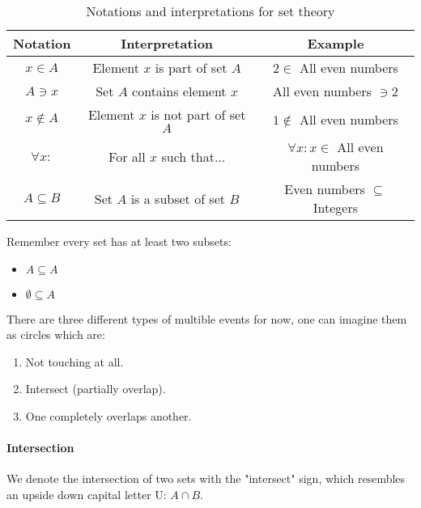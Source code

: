 \documentclass{article}
\begin{document}
\begin{table}[htb]
    \centering
    \begin{tabular}{c|c|c}
        \toprule
        \textbf{Notation} & \textbf{Interpretation} & \textbf{Example} \\
        \midrule
        $x \in A$ & Element $x$ is part of set $A$ & $2 \in$ All even numbers \\
        $A \ni x$ & Set $A$ contains element $x$ & All even numbers $\ni 2$ \\
        $x \notin A$ & Element $x$ is not part of set $A$ & $1 \notin$ All even numbers \\
        $\forall x:$ & For all $x$ such that... & $\forall x: x \in$ All even numbers \\
        $A \subseteq B$ & Set $A$ is a subset of set $B$ & Even numbers $\subseteq$ Integers \\
        \bottomrule
    \end{tabular}
    \caption{Notations and interpretations for set theory}
\end{table}

Remember every set has at least two subsets:\\
\begin{itemize}
  \item $A \subseteq A$
  \item $\emptyset \subseteq A$
\end{itemize}

There are three different types of multible events for now, one can imagine them as circles which are:
\begin{enumerate}
  \item Not touching at all.
  \item Intersect (partially overlap).
  \item One completely overlaps another.
\end{enumerate}

\paragraph{Intersection}
We denote the intersection of two sets with the "intersect" sign, which
resembles an upside down capital letter U: $A \cap B$.

\begin{center}

\end{center}
\end{document}
